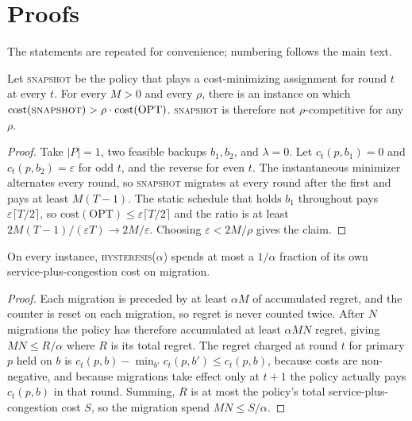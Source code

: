 \appendices
\section{Proofs}
\label{app:proofs}

The statements are repeated for convenience; numbering follows the main
text.

\begin{theorem}
Let \textsc{snapshot} be the policy that plays a cost-minimizing assignment for
round $t$ at every $t$. For every $M > 0$ and every $\rho$, there is an instance on
which $\mathrm{cost}(\textsc{snapshot}) > \rho \cdot \mathrm{cost}(\mathrm{OPT})$.
\textsc{snapshot} is therefore not $\rho$-competitive for any $\rho$.
\end{theorem}

\begin{proof}
Take $|P| = 1$, two feasible backups $b_1, b_2$, and $\lambda = 0$. Let
$c_t(p,b_1) = 0$ and $c_t(p,b_2) = \varepsilon$ for odd $t$, and the reverse for
even $t$. The instantaneous minimizer alternates every round, so \textsc{snapshot}
migrates at every round after the first and pays at least $M(T-1)$. The static
schedule that holds $b_1$ throughout pays $\varepsilon \lceil T/2 \rceil$, so
$\mathrm{cost}(\mathrm{OPT}) \le \varepsilon \lceil T/2 \rceil$ and the ratio is at
least $2M(T-1)/(\varepsilon T) \to 2M/\varepsilon$. Choosing
$\varepsilon < 2M/\rho$ gives the claim.
\end{proof}

\begin{proposition}
On every instance, \textsc{hysteresis}($\alpha$) spends at most a $1/\alpha$
fraction of its own service-plus-congestion cost on migration.
\end{proposition}

\begin{proof}
Each migration is preceded by at least $\alpha M$ of accumulated regret, and the
counter is reset on each migration, so regret is never counted twice. After $N$
migrations the policy has therefore accumulated at least $\alpha M N$ regret, giving
$MN \le R/\alpha$ where $R$ is its total regret. The regret charged at round $t$ for
primary $p$ held on $b$ is $c_t(p,b) - \min_{b'}c_t(p,b') \le c_t(p,b)$, because
costs are non-negative, and because migrations take effect only at $t+1$ the policy
actually pays $c_t(p,b)$ in that round. Summing, $R$ is at most the policy's total
service-plus-congestion cost $S$, so the migration spend $MN \le S/\alpha$.
\end{proof}

